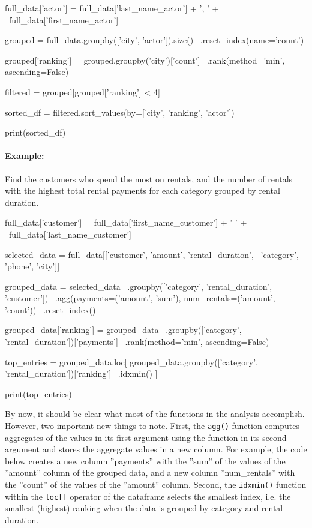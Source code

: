 \begin{samepage}
\begin{pythoncode}
full_data['actor'] = full_data['last_name_actor'] + ', ' + \
                     full_data['first_name_actor']

grouped = full_data.groupby(['city', 'actor']).size() \
            .reset_index(name='count')
            
grouped['ranking'] = grouped.groupby('city')['count'] \
            .rank(method='min', ascending=False)
            
filtered = grouped[grouped['ranking'] < 4]

sorted_df = filtered.sort_values(by=['city', 'ranking', 'actor'])

print(sorted_df)
\end{pythoncode}
\end{samepage}

\paragraph*{Example:} Find the customers who spend the most on rentals, and the number of rentals with the highest total rental payments for each category grouped by rental duration.

\begin{samepage}
\begin{pythoncode}
full_data['customer'] = full_data['first_name_customer'] + ' ' + \
                        full_data['last_name_customer']

selected_data = full_data[['customer', 'amount', 'rental_duration', \
                           'category', 'phone', 'city']]

grouped_data = selected_data \
    .groupby(['category', 'rental_duration', 'customer']) \
    .agg(payments=('amount', 'sum'), num_rentals=('amount', 'count')) \
    .reset_index()
     
grouped_data['ranking'] = grouped_data \
      .groupby(['category', 'rental_duration'])['payments'] \
      .rank(method='min', ascending=False)

top_entries = grouped_data.loc[
    grouped_data.groupby(['category', 'rental_duration'])['ranking'] \
                .idxmin() ]

print(top_entries)
\end{pythoncode}
\end{samepage}

By now, it should be clear what most of the functions in the analysis accomplish. However, two important new things to note. First, the \texttt{agg()} function computes aggregates of the values in its first argument using the function in its second argument and stores the aggregate values in a new column. For example, the code below creates a new column ''payments'' with the ''sum'' of the values of the ''amount'' column of the grouped data, and a new column ''num\_rentals'' with the ''count'' of the values of the ''amount'' column. Second, the \texttt{idxmin()} function within the \texttt{loc[]} operator of the dataframe selects the smallest index, i.e. the smallest (highest) ranking when the data is grouped by category and rental duration.

